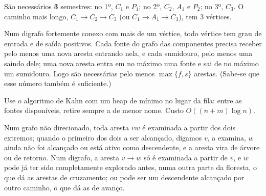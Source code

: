  São necessários \textbf{3} semestres: no 1º, $C_1$ e $P_1$; no 2º, $C_2$, $A_1$ e $P_2$; no 3º, $C_3$. O caminho mais longo, $C_1\to C_2\to C_3$ (ou $C_1\to A_1\to C_3$), tem 3 vértices.

 Num digrafo fortemente conexo com mais de um vértice, todo vértice tem grau de entrada e de saída positivos. Cada fonte do grafo das componentes precisa receber pelo menos uma nova aresta entrando nela, e cada sumidouro, pelo menos uma saindo dele; uma nova aresta entra em no máximo uma fonte e sai de no máximo um sumidouro. Logo são necessárias pelo menos $\max\{f,s\}$ arestas. (Sabe-se que esse número também é suficiente.)

 Use o algoritmo de Kahn com um heap de mínimo no lugar da fila: entre as fontes disponíveis, retire sempre a de menor nome. Custo $O((n+m)\log n)$.

 Num grafo não direcionado, toda aresta $vw$ é examinada a partir dos dois extremos; quando o primeiro dos dois a ser alcançado, digamos $v$, a examina, $w$ ainda não foi alcançado ou está ativo como descendente, e a aresta vira de árvore ou de retorno. Num digrafo, a aresta $v\to w$ só é examinada a partir de $v$, e $w$ pode já ter sido completamente explorado antes, numa outra parte da floresta, o que dá as arestas de cruzamento; ou pode ser um descendente alcançado por outro caminho, o que dá as de avanço.
